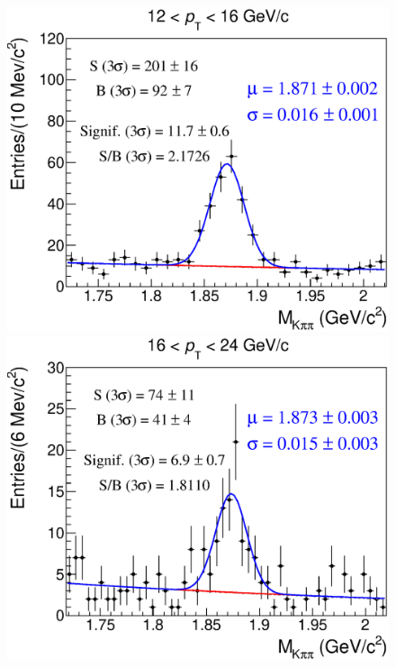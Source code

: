 \documentclass[b5paper,10pt,twoside,oldstyle,classica]{toptesi}
\begin{document}
\begin{figure}[h]
\begin{center}
{\includegraphics[scale = 0.25]{MassFits_cutset1_8.eps}}
\hspace{0cm}
{\includegraphics[scale = 0.25]{MassFits_cutset1_9.eps}}
\end{center}
\end{figure}
\end{document}
